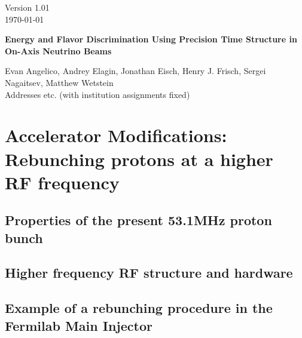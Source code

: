 \documentclass[12pt]{article}
\begin{document}
\pagestyle{plain}
%

\begin{flushright}
Version 1.01\\
\today
\end{flushright}
%
%
\begin{center}
{\Large\bf Energy and Flavor Discrimination Using Precision Time
  Structure in On-Axis Neutrino Beams}\\

\vskip0.2in

Evan Angelico, Andrey Elagin, Jonathan Eisch, Henry J. Frisch, Sergei
  Nagaitsev, Matthew Wetstein\\

Addresses etc. (with institution assignments fixed)
\end{center}




%
%
\section{Accelerator Modifications: Rebunching protons at a higher RF frequency}
\label{RF}

\subsection{Properties of the present 53.1MHz proton bunch}

\subsection{Higher frequency RF structure and hardware}


\subsection{Example of a rebunching procedure in the Fermilab Main Injector}
\end{document}
